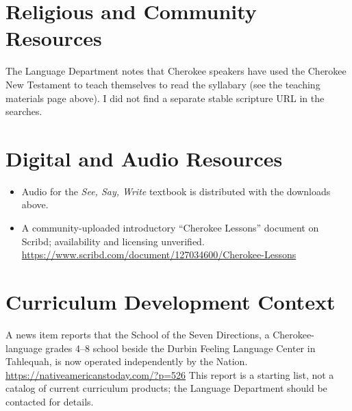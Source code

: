 \documentclass[12pt]{article}
\begin{document}
\section{Religious and Community Resources}
The Language Department notes that Cherokee speakers have used the Cherokee New Testament to teach themselves to read the syllabary (see the teaching materials page above). I did not find a separate stable scripture URL in the searches.

\section{Digital and Audio Resources}
\begin{itemize}
\item Audio for the \emph{See, Say, Write} textbook is distributed with the downloads above.
\item A community-uploaded introductory ``Cherokee Lessons'' document on Scribd; availability and licensing unverified. \url{https://www.scribd.com/document/127034600/Cherokee-Lessons}
\end{itemize}

\section{Curriculum Development Context}
A news item reports that the School of the Seven Directions, a Cherokee-language grades 4--8 school beside the Durbin Feeling Language Center in Tahlequah, is now operated independently by the Nation. \url{https://nativeamericanstoday.com/?p=526} This report is a starting list, not a catalog of current curriculum products; the Language Department should be contacted for details.
\end{document}
